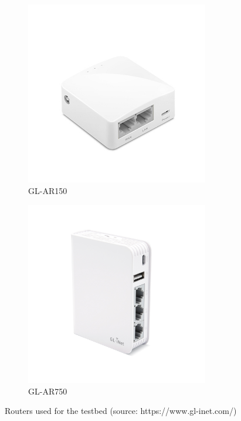 \begin{figure}[H]
\centering
\begin{subfigure}{.5\textwidth}
  \centering
	\includegraphics[width=8cm]{image/AR150.jpg}%
	\caption{GL-AR150}%
	\label{figure:AR150}%
\end{subfigure}%
\begin{subfigure}{.5\textwidth}
  \centering
  \includegraphics[width=8cm]{image/AR750.jpg}%
	\caption{GL-AR750}%
	\label{figure:AR750}%
\end{subfigure}
\caption{Routers used for the testbed (source: https://www.gl-inet.com/)}
\label{fig:routers}
\end{figure}


